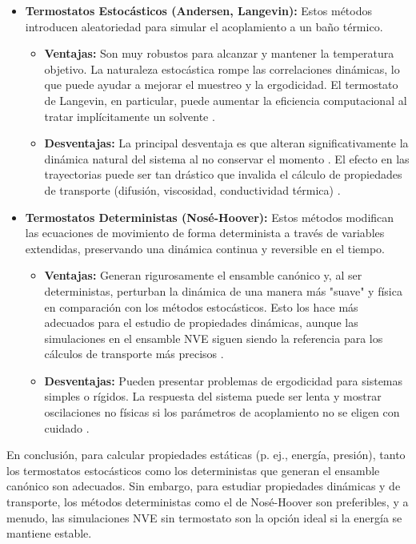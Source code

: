 \begin{itemize}
    \item \textbf{Termostatos Estocásticos (Andersen, Langevin):} Estos métodos introducen aleatoriedad para simular el acoplamiento a un baño térmico.
    \begin{itemize}
        \item \textbf{Ventajas:} Son muy robustos para alcanzar y mantener la temperatura objetivo. La naturaleza estocástica rompe las correlaciones dinámicas, lo que puede ayudar a mejorar el muestreo y la ergodicidad. El termostato de Langevin, en particular, puede aumentar la eficiencia computacional al tratar implícitamente un solvente \cite[108]{zhou2022molecular}.
        \item \textbf{Desventajas:} La principal desventaja es que alteran significativamente la dinámica natural del sistema al no conservar el momento \cite[758]{frenkel2002understanding}. El efecto en las trayectorias puede ser tan drástico que invalida el cálculo de propiedades de transporte (difusión, viscosidad, conductividad térmica) \cite[758]{frenkel2002understanding}.
    \end{itemize}
    \item \textbf{Termostatos Deterministas (Nosé-Hoover):} Estos métodos modifican las ecuaciones de movimiento de forma determinista a través de variables extendidas, preservando una dinámica continua y reversible en el tiempo.
    \begin{itemize}
        \item \textbf{Ventajas:} Generan rigurosamente el ensamble canónico y, al ser deterministas, perturban la dinámica de una manera más "suave" y física en comparación con los métodos estocásticos. Esto los hace más adecuados para el estudio de propiedades dinámicas, aunque las simulaciones en el ensamble NVE siguen siendo la referencia para los cálculos de transporte más precisos \cite[759, 278]{frenkel2002understanding}.
        \item \textbf{Desventajas:} Pueden presentar problemas de ergodicidad para sistemas simples o rígidos. La respuesta del sistema puede ser lenta y mostrar oscilaciones no físicas si los parámetros de acoplamiento no se eligen con cuidado \cite[759, 278]{frenkel2002understanding}.
    \end{itemize}
\end{itemize}

En conclusión, para calcular propiedades estáticas (p. ej., energía, presión), tanto los termostatos estocásticos como los deterministas que generan el ensamble canónico son adecuados. Sin embargo, para estudiar propiedades dinámicas y de transporte, los métodos deterministas como el de Nosé-Hoover son preferibles, y a menudo, las simulaciones NVE sin termostato son la opción ideal si la energía se mantiene estable.


